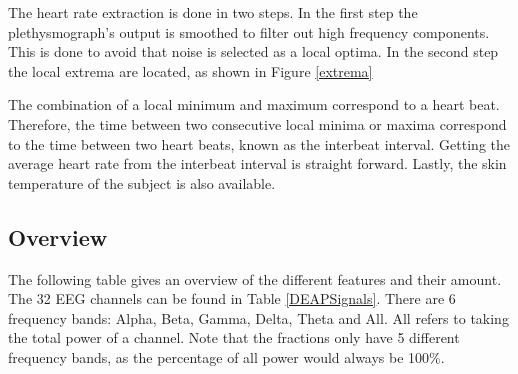 
The heart rate extraction is done in two steps. In the first step the plethysmograph's output is smoothed to filter out high frequency components. This is done to avoid that noise is selected as a local optima. In the second step the local extrema are located, as shown in Figure \ref{extrema}


The combination of a local minimum and maximum correspond to a heart beat\citep{DEAP}. Therefore, the time between two consecutive local minima or maxima correspond to the time between two heart beats, known as the interbeat interval. Getting the average heart rate from the interbeat interval is straight forward. Lastly, the skin temperature of the subject is also available.

\subsection{Overview}

The following table gives an overview of the different features and their amount. The 32 EEG channels can be found in Table \ref{DEAPSignals}. There are 6 frequency bands: Alpha, Beta, Gamma, Delta, Theta and All. All refers to taking the total power of a channel. Note that the fractions only have 5 different frequency bands, as the percentage of all power would always be 100$\%$. 

\clearpage

